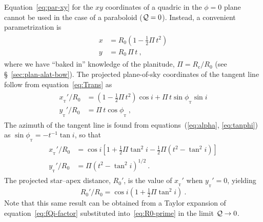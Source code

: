 \documentclass[useAMS, usenatbib, a4paper]{mnras}
\newcommand\C{\ensuremath{\mathrm{c}}}
\newcommand\T{_{\mathrm{\scriptscriptstyle T}}}
\begin{document}
Equation~\eqref{eq:par-xy} for the \(xy\) coordinates of a quadric in the \(\phi = 0\) plane cannot be used in the case of a paraboloid (\(\mathcal{Q} = 0\)).  Instead, a convenient parametrization is
\begin{gather}
  \label{eq:parabola-xy}
  \begin{aligned}
    x &= R_0 \left(1  - \tfrac{1}{2} \Pi\, t^2\right) \\
    y &= R_0\, \Pi\, t \ ,
  \end{aligned}
\end{gather}
where we have ``baked in'' knowledge of the planitude,
\(\Pi = R_{\C}/R_0\) (see \S~\ref{sec:plan-alat-bow}). The projected
plane-of-sky coordinates of the tangent line follow from
equation~\eqref{eq:Trans} as
\begin{gather}
  \label{eq:parabola-xy-prime-phi}
  \begin{aligned}
    x_{\T}' / R_0 &= \left(1 - \tfrac{1}{2} \Pi\, t^2\right) \cos i
      + \Pi\, t \sin\phi_{\T} \sin i\\
    y_{\T}' / R_0 &= \Pi\, t \cos\phi_{\T}\ ,
  \end{aligned}
\end{gather}
The azimuth of the tangent line is found from
equations~(\ref{eq:alpha}, \ref{eq:tanphi}) as
\(\sin\phi_{\T} = -t^{-1} \tan i \), so that
\begin{gather}
  \label{eq:parabola-xy-prime-final}
  \begin{aligned}
    x_{\T}' / R_0 &= \cos i \left[ 1 + \tfrac{1}{2} \Pi \tan^2 i -
      \tfrac{1}{2} \Pi \left( t^2 - \tan^2 i \right) \right]\\
    y_{\T}' / R_0 &= \Pi \left( t^2 - \tan^2 i \right)^{1/2} \ .
  \end{aligned}
\end{gather}
The projected star--apex distance, \(R_0'\), is the value of
\(x_{\T}'\) when \(y_{\T}' = 0\), yielding
\begin{equation}
  \label{eq:parabola-R0-prime}
  R_0' / R_0 = \cos i \left( 1 + \tfrac{1}{2} \Pi \tan^2 i  \right) \ . 
\end{equation}
Note that this same result can be obtained from a Taylor expansion of
equation~\eqref{eq:fQi-factor} substituted into~\eqref{eq:R0-prime} in
the limit \(\mathcal{Q} \to 0\).
\end{document}
